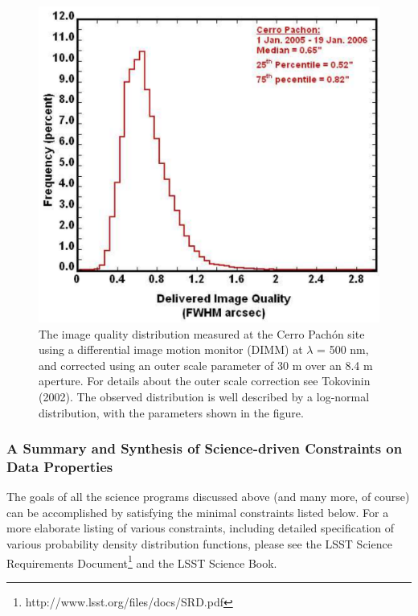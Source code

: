 \documentclass{emulateapj}
\begin{document}
\begin{figure}
\includegraphics[width=1.0\hsize,clip]{seeing2.pdf}
\caption{
The image quality distribution measured at the Cerro Pach\'{o}n site using 
a differential image motion monitor (DIMM) at $\lambda$ = 500 nm, and corrected 
using an outer scale parameter of 30 m over an 8.4 m aperture. For details 
about the outer scale correction see Tokovinin (2002). The observed distribution 
is well described by a log-normal distribution, with the parameters shown in 
the figure.} 
\label{Fig:seeing}
\end{figure}

\subsubsection{A Summary and Synthesis of Science-driven Constraints on Data Properties}

The goals of all the science programs discussed above 
(and many more, of course) can be accomplished by satisfying the 
minimal constraints listed below. For a more elaborate listing
of various constraints, including detailed specification of 
various probability density distribution functions, please see the LSST Science
Requirements Document\footnote{http://www.lsst.org/files/docs/SRD.pdf}
and the LSST Science Book. 
\end{document}
